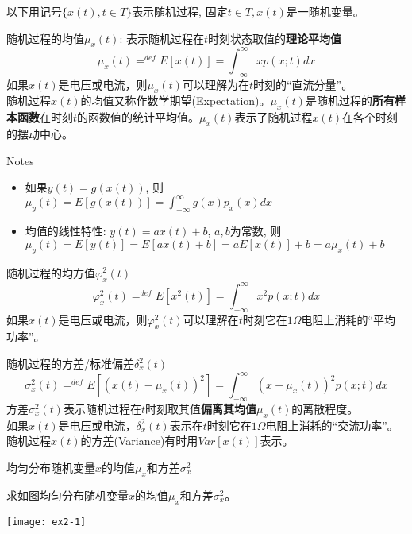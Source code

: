 \begin{frame}
以下用记号$\{x(t),t\in T\}$表示随机过程, 固定$t\in T, x(t)$是一随机变量。
\begin{block}{随机过程的均值$\mu_x(t)$: 表示随机过程在$t$时刻状态取值的\textbf{理论平均值}}
	\[\mu_x(t)\mathop{=}^{def}E[x(t)]=\int_{-\infty}^{\infty}xp(x;t)dx \]
	如果$x(t)$是电压或电流，则$\mu_x(t)$可以理解为在$t$时刻的``直流分量''。\\
	随机过程$x(t)$的均值又称作数学期望(Expectation)。$\mu_x(t)$是随机过程的\textbf{所有样本函数}在时刻$t$的函数值的统计平均值。$\mu_x(t)$表示了随机过程$x(t)$在各个时刻的摆动中心。
\end{block}

\begin{block}{Notes}
	\begin{itemize}
		\item 如果$y(t)=g(x(t))$, 则$\mu_y(t)=E[g(x(t))]=\int_{-\infty}^{\infty}g(x)p_x(x)dx$
		\item 均值的线性特性: $y(t)=ax(t)+b$, \quad $a,b$为常数, 则$\mu_y(t)=E[y(t)]=E[ax(t)+b]=aE[x(t)]+b=a\mu_x(t)+b$
	\end{itemize}
\end{block}
\end{frame}

\begin{frame}
\begin{block}{随机过程的均方值$\varphi_x^2(t)$}
	\[\varphi_x^2(t)\mathop{=}^{def}E[x^2(t)]=\int_{-\infty}^{\infty}x^2p(x;t)dx \]
	如果$x(t)$是电压或电流，则$\varphi_x^2(t)$可以理解在$t$时刻它在$1\Omega$电阻上消耗的``平均功率''。
\end{block}
\begin{block}{随机过程的方差/标准偏差$\delta_x^2(t)$}
\[\sigma_x^2(t)\mathop{=}^{def}E[(x(t)-\mu_x(t))^2]=\int_{-\infty}^{\infty}(x-\mu_x(t))^2p(x;t)dx \]
方差$\sigma_x^2(t)$表示随机过程在$t$时刻取其值\textbf{偏离其均值}$\mu_x(t)$的离散程度。\\
如果$x(t)$是电压或电流，$\delta_x^2(t)$表示在$t$时刻它在$1\Omega$电阻上消耗的``交流功率''。\\
随机过程$x(t)$的方差(Variance)有时用$Var[x(t)]$表示。
\end{block}
\end{frame}

\begin{frame}{均匀分布随机变量$x$的均值$\mu_x$和方差$\sigma_x^2$}
\begin{example}
	求如图均匀分布随机变量$x$的均值$\mu_x$和方差$\sigma_x^2$。
\end{example}
\texttt{[image: ex2-1]}
\end{frame}


